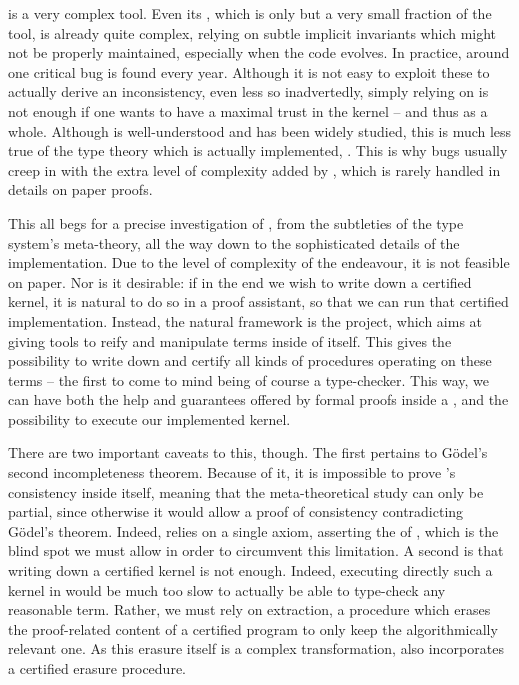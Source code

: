  is a very complex tool. Even its , which is only but a very small
fraction of the tool, is already quite complex, relying on subtle implicit invariants which
might not be properly maintained, especially when the code evolves.
In practice, around one critical bug is found every year.%
Although it is not easy to exploit these to actually derive an inconsistency, even less
so inadvertedly, simply relying on  is not enough if
one wants to have a maximal trust in the kernel – and thus  as a whole.
Although  is well-understood and has been widely studied,
this is much less true of the type theory which is actually implemented, .
This is why bugs usually creep in with the extra level of complexity added by ,
which is rarely handled in details on paper proofs.%

This all begs for a precise investigation of , from the subtleties of the
type system’s meta-theory, all the way down to the sophisticated details of the implementation.
Due to the level of complexity of the endeavour, it is not feasible on paper. Nor is it
desirable: if in the end we wish to write down a certified kernel, it is natural to do so
in a proof assistant, so that we can run that certified implementation.
Instead, the natural framework is the  project,
which aims at giving tools to reify and manipulate  terms%
inside of  itself. This gives the possibility to write down and certify
all kinds of procedures operating on these terms – the first to come to mind being of course
a type-checker. This way, we can have both the help and guarantees offered by
formal proofs inside a , and the possibility to execute
our implemented kernel.

There are two important caveats to this, though.
The first pertains to Gödel’s second incompleteness
theorem. Because of it, it is impossible to prove ’s consistency inside  itself,
meaning that the meta-theoretical study can only be partial, since otherwise it would allow
a proof of consistency contradicting Gödel’s theorem. Indeed,  relies on a single
axiom, asserting the  of ,
which is the blind spot we must allow in order to circumvent this limitation.
A second is that writing down a certified kernel is not enough. Indeed, executing directly
such a kernel in  would be much too slow to actually be able to type-check
any reasonable term. Rather, we must rely on extraction, a procedure which erases the
proof-related content of a certified program to only keep the algorithmically relevant one.
As this erasure itself is a complex transformation,  also incorporates a certified
erasure procedure.

